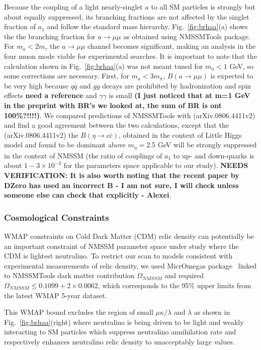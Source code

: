 \documentclass[aps,prl,twocolumn,nofootinbib,superscriptaddress]{revtex4}
\begin{document}
{Because the coupling of a light nearly-singlet $a$ to all SM particles is strongly
but about equally suppressed, its branching fractions are not affected by the singlet
fraction of  $a_1$ and follow the standard mass hierarchy. Fig.~\ref{fig:brhaa}(a)
shows the the branching fraction for $a \to \mu\mu$ as obtained using NMSSMTools package. 
For $m_a < 2m_\tau$ the $a \to \mu\mu$ channel becomes significant, making an analysis
in the four muon mode viable for experimental searches. It is important to note that 
the calculation shown in Fig.~\ref{fig:brhaa}(a) was not meant tuned for $m_a<1$ GeV,
so some corrections are necessary. First, for $m_a<3m_\pi$, $B(a \to \mu\mu)$ is 
expected to be very high because $q\bar{q}$ and $gg$ decays are prohibited by hadronization 
and spin effects {\bf need a reference} and $\gamma \gamma$ is small {\bf (I just noticed 
that at m=1 GeV in the preprint with BR's we looked at, the sum of BR is ont 100\%?!!!!)}.
We compared predictions of NMSSMTools with (arXiv.0806.4411v2) and find a good agreement
between the two calculations, except that the (arXiv.0806.4411v2) the $B(\eta \to c \bar{c} )$,
obtained in the context of Little Higgs model and found to be dominant above $m_\eta=$2.5 GeV 
will be strongly suppressed in the context of NMSSM (the ratio of couplings of $a_1$ to up- 
and down-quarks is about $1-3 \times 10^{-3}$ for the parameters space applicable to our
study). {\bf NEEDS VERIFICATION: It is also worth noting that the recent paper by DZero
has used an incorrect B - I am not sure, I will check unless someone else can check that 
explicitly - Alexei}.

\subsubsection{Cosmological Constraints}

WMAP constraints on Cold Dark Matter (CDM) relic density can potentially be an
important constraint of NMSSM parameter space under study
where the CDM is lightest neutralino.
To restrict our scan to models consistent with experimental measurements of relic 
density, we used MicrOmegas package~\cite{micrOmegas} linked to NMSSMTools
dark matter  contribution $\Omega_{NMSSM}$ 
and required $\Omega_{NMSSM} \le 0.1099 + 2\times0.0062$,
which corresponds to the 95\% upper limits from the latest WMAP 5-year dataset. 

This WMAP bound  excludes the region of 
small $\mu\kappa/\lambda$ and $\lambda$ as shown in Fig.~\ref{fig:brhaa}(right)
where neutralino is being driven to be light and weakly interacting to SM
particles which suppress neutralino annihilation rate and respectively enhances 
neutralino relic density to unacceptably large values.


}
\end{document}
